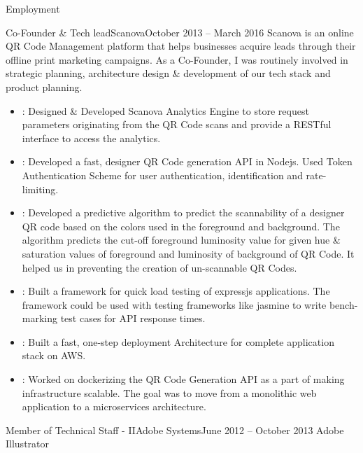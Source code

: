 \documentclass[]{mukeshcv}
\begin{document}
	\begin{cvsection}{Employment}
		\begin{cvsubsection}{Co-Founder \& Tech lead}{Scanova}{October 2013 -- March 2016}
		Scanova is an online QR Code Management platform that helps businesses acquire leads through their offline print marketing campaigns. As a Co-Founder, I was routinely involved in strategic planning, architecture design \& development of our tech stack and product planning.  \\

			\begin{itemize}
				\item {}: Designed \& Developed Scanova Analytics Engine to store request parameters originating from the  QR Code scans and provide a RESTful interface to access the analytics.
				\item {}: Developed a fast, designer QR Code generation API in Nodejs. Used Token Authentication Scheme for user authentication, identification and rate-limiting.
				\item {}: Developed a predictive algorithm to predict the scannability of a designer QR code based on the colors used in the foreground and background. The algorithm predicts the cut-off foreground luminosity value for given hue \& saturation values of foreground and luminosity of background of QR Code. It helped us in preventing the creation of un-scannable QR Codes.
				\item {}: Built a framework for quick load testing of expressjs applications. The framework could be used with testing frameworks like jasmine to write bench-marking test cases for API response times.
				\item {}: Built a fast, one-step deployment Architecture for complete application stack on AWS.
				\item {}: Worked on dockerizing the QR Code Generation API as a part of making infrastructure scalable. The goal was to move from a monolithic web application to a microservices architecture.
			\end{itemize}
		\end{cvsubsection}
		\begin{cvsubsection}{Member of Technical Staff - II}{Adobe Systems}{June 2012 -- October 2013}	
			Adobe Illustrator

\end{cvsubsection}
\end{cvsection}
\end{document}
